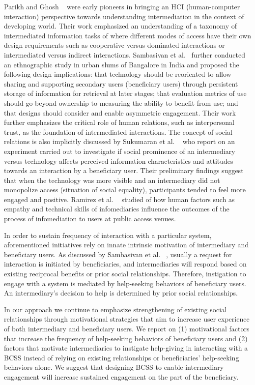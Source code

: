 \documentclass{sig-alternate}
\begin{document}
Parikh and Ghosh ~\cite{parikh2006} were early pioneers in bringing an HCI
(human-computer interaction) perspective towards understanding
intermediation in the context of developing world. Their work emphasized an
understanding of a taxonomy of intermediated information tasks of where
different modes of access have their own design requirements such as
cooperative versus dominated interactions or intermediated versus indirect
interactions. Sambasivan et al.~\cite{sambasivan2010} further conducted an
ethnographic study in urban slums of Bangalore in India and proposed the
following design implications: that technology should be reoriented to
allow sharing and supporting secondary users (beneficiary users) through
persistent storage of information for retrieval at later stages; that evaluation
metrics of use should go beyond ownership to measuring the ability to benefit
from use; and that designs should consider and enable asymmetric engagement. 
Their work further emphasizes
the critical role of human relations, such as interpersonal trust, as the foundation
of intermediated interactions. The concept of social relations is also
implicitly discussed by Sukumaran et al. ~\cite{sukumaran2009intermediated} who
report on an experiment carried out to investigate if social prominence
of an intermediary versus technology affects perceived information
characteristics and attitudes towards an interaction by a beneficiary user.
Their preliminary findings suggest that when the technology was more visible
and an intermediary did not monopolize access (situation of social equality),
participants tended to feel more engaged and positive. Ramirez et al.
~\cite{ramirez2013infomediaries} studied of how human factors such as empathy
and technical skills of infomediaries influence the outcomes of the process of
infomediation to users at public access venues.

In order to sustain frequency of interaction with a particular system,
aforementioned initiatives rely on innate intrinsic motivation of intermediary
and beneficiary users. As discussed by Sambasivan et al. ~\cite{sambasivan2010}, usually a request
for interaction is initiated by beneficiaries, and intermediaries will respond
based on existing reciprocal benefits or prior social relationships.
Therefore, instigation to engage with a system is mediated by help-seeking
behaviors of beneficiary users. An intermediary's decision to help is determined
by prior social relationships.

In our approach we continue to emphasize strengthening of existing social
relationships through motivational strategies that aim to increase user
experience of both intermediary and beneficiary users. We report on (1)
motivational factors that increase the frequency of help-seeking behaviors of
beneficiary users and (2) factors that motivate intermediaries to instigate
help-giving in interacting with a BCSS instead of relying on existing
relationships or beneficiaries' help-seeking behaviors alone. 
We suggest that designing BCSS to enable intermediary engagement will 
increase sustained engagement on the part of the beneficiary.
\end{document}
